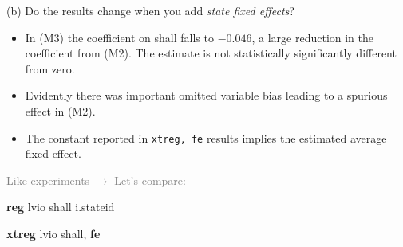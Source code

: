 \documentclass[
  10pt,
  ignorenonframetext,
]{beamer}
\newenvironment{Shaded}{\begin{snugshade}}{\end{snugshade}}
\newcommand{\KeywordTok}[1]{\textcolor[rgb]{0.13,0.29,0.53}{\textbf{#1}}}
\newcommand{\NormalTok}[1]{#1}
\begin{document}
\begin{frame}[fragile]{(b) Do the results change when you add
\emph{state fixed effects}?}
\protect\hypertarget{b-do-the-results-change-when-you-add-state-fixed-effects-2}{}
\begin{itemize}
\item
  In (M3) the coefficient on shall falls to \(-0.046\), a large
  reduction in the coefficient from (M2). The estimate is not
  statistically significantly different from zero.
\item
  Evidently there was important omitted variable bias leading to a
  spurious effect in (M2).
\item
  The constant reported in \texttt{xtreg,\ fe} results implies the
  estimated average fixed effect.
\end{itemize}

\vspace{2mm}

\small \textcolor{gray}{Like experiments $\rightarrow$ Let's compare:}

\footnotesize

\begin{Shaded}
\begin{Highlighting}[]
\KeywordTok{reg}\NormalTok{ lvio shall i.stateid }
\end{Highlighting}
\end{Shaded}

\begin{Shaded}
\begin{Highlighting}[]
\KeywordTok{xtreg}\NormalTok{ lvio shall, }\KeywordTok{fe}
\end{Highlighting}
\end{Shaded}
\end{frame}
\end{document}
